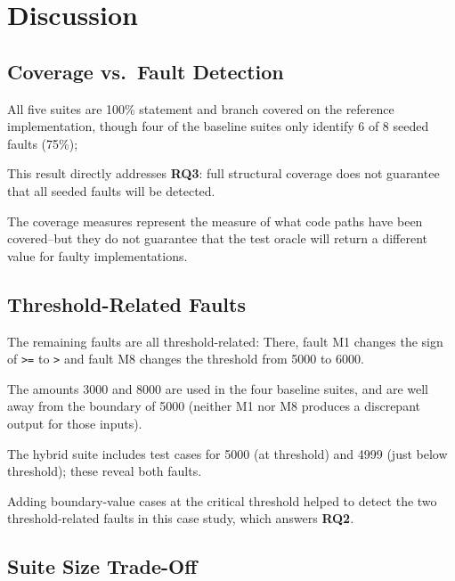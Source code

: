 \documentclass[conference]{IEEEtran}
\begin{document}

\section{Discussion}

\label{sec:discussion}



\subsection{Coverage vs.\ Fault Detection}

All five suites are 100\% statement and branch covered on the reference implementation, though four of the baseline suites only identify 6 of 8 seeded faults (75\%);


This result directly addresses \textbf{RQ3}: full structural coverage does not guarantee that all seeded faults will be detected.

The coverage measures represent the measure of what code paths have been covered–but they do not guarantee that the test oracle will return a different value for faulty implementations.



\subsection{Threshold-Related Faults}

The remaining faults are all threshold-related: There, fault M1 changes the sign of \texttt{>=} to \texttt{>} and fault M8 changes the threshold from 5000 to 6000.

The amounts 3000 and 8000 are used in the four baseline suites, and are well away from the boundary of 5000 (neither M1 nor M8 produces a discrepant output for those inputs).

The hybrid suite includes test cases for 5000 (at threshold) and 4999 (just below threshold); these reveal both faults.

Adding boundary-value cases at the critical threshold helped to detect the two threshold-related faults in this case study, which answers \textbf{RQ2}.




\subsection{Suite Size Trade-Off}
\end{document}

